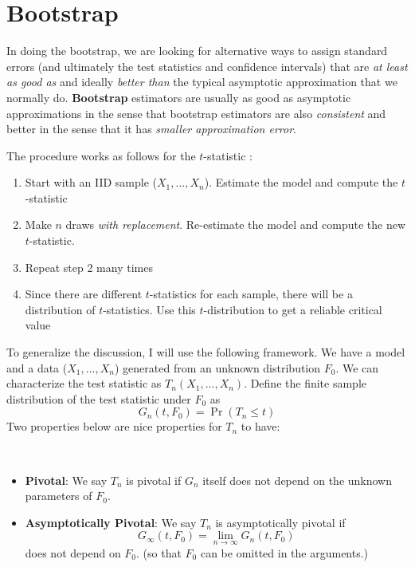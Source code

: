 \section{Bootstrap}
In doing the bootstrap, we are looking for alternative ways to assign standard errors (and ultimately the test statistics and confidence intervals) that are \textit{at least as good as} and ideally \textit{better than} the typical asymptotic approximation that we normally do. \textbf{Bootstrap} estimators are usually as good as asymptotic approximations in the sense that bootstrap estimators are also \textit{consistent} and better in the sense that it has \textit{smaller approximation error}. \par
The procedure works as follows for the $t$-statistic : 
\begin{enumerate}
\item Start with an IID sample ($X_1,...,X_n$). Estimate the model and compute the $t$-statistic
\item Make $n$ draws \textit{with replacement}. Re-estimate the model and compute the new $t$-statistic.
\item Repeat step 2 many times
\item Since there are different $t$-statistics for each sample, there will be a distribution of $t$-statistics. Use this $t$-distribution to get a reliable critical value
\end{enumerate}\par
To generalize the discussion, I will use the following framework. We have a model and a data ($X_1,...,X_n$) generated from an unknown distribution $F_0$. We can characterize the test statistic as $T_n(X_1,...,X_n)$. Define the finite sample distribution of the test statistic under $F_0$ as
\[
G_n(t,F_0) = \Pr(T_n\leq t)
\]
Two properties below are nice properties for $T_n$ to have:
\begin{mdframed}[backgroundcolor=blue!5] 
\begin{definition}  \ \\
\begin{itemize}
\item \textbf{Pivotal}: We say $T_n$ is pivotal if $G_n$ itself does not depend on the unknown parameters of $F_0$. 
\item \textbf{Asymptotically Pivotal}: We say $T_n$ is asymptotically pivotal if 
\[
G_\infty(t,F_0)=\lim_{n\to\infty}G_n(t,F_0)
\]
 does not depend on $F_0$. (so that $F_0$ can be omitted in the arguments.)
\end{itemize}
\end{definition}
\end{mdframed} 
